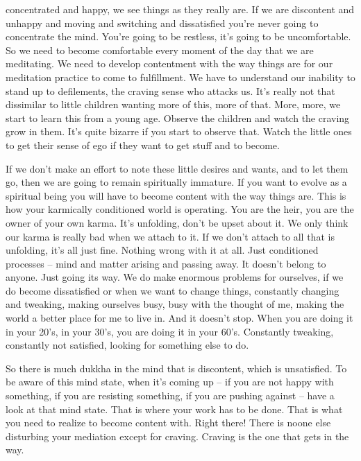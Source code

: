 \documentclass[letterpaper,10pt,english]{sphinxmanual}
\begin{document}
concentrated and happy, we see things as they really are. If we are discontent
and unhappy and moving and switching and dissatisfied you’re never going
to concentrate the mind. You’re going to be restless, it’s going to be uncomfortable. So we need to become comfortable every moment of the day that
we are meditating. We need to develop contentment with the way things are
for  our  meditation  practice  to  come  to  fulfillment. We  have  to  understand
our inability to stand up to defilements, the craving sense who attacks us. It’s
really not that dissimilar to little children wanting more of this, more of that.
More, more, we start to learn this from a young age. Observe the children
and watch the craving grow in them. It’s quite bizarre if you start to observe
that. Watch the little ones to get their sense of ego if they want to get stuff
and to become.

\sphinxAtStartPar
If we don’t make an effort to note these little desires and wants, and to
let them go, then we are going to remain spiritually immature. If you want
to evolve as a spiritual being you will have to become content with the way
things are. This is how your karmically conditioned world is operating. You
are the heir, you are the owner of your own karma. It’s unfolding, don’t be
upset about it. We only think our karma is really bad when we attach to it. If
  we don’t attach to all that is unfolding, it’s all just fine. Nothing wrong with
it at all. Just conditioned processes – mind and matter arising and passing
away. It doesn’t belong to anyone. Just going its way. We do make enormous
problems  for  ourselves,  if  we  do  become  dissatisfied  or  when  we  want  to
change  things,  constantly  changing  and  tweaking,  making  ourselves  busy,
busy with the thought of me, making the world a better place for me to live
in. And it doesn’t stop. When you are doing it in your 20’s, in your 30’s, you
are doing it in your 60’s. Constantly tweaking, constantly not satisfied, looking for something else to do.

\sphinxAtStartPar
So there is much dukkha in the mind that is discontent, which is unsatisfied. To be aware of this mind state, when it’s coming up – if you are not
happy  with  something,  if  you  are  resisting  something,  if  you  are  pushing
against – have a look at that mind state. That is where your work has to be
done. That is what you need to realize to become content with. Right there!
There is no\sphinxhyphen{}one else disturbing your mediation except for craving. Craving
is the one that gets in the way.
\end{document}
